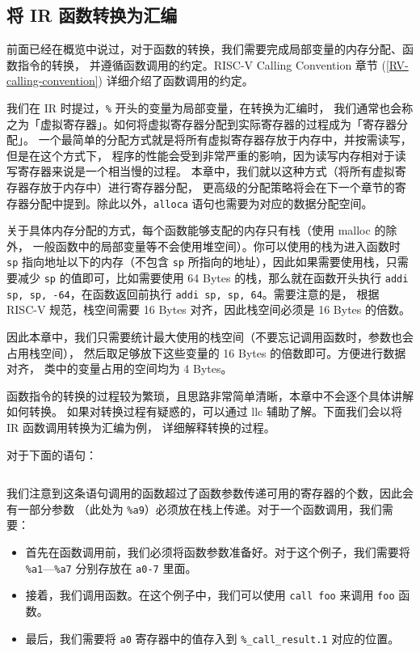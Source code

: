 \subsection{将 IR 函数转换为汇编}\label{IR-func-to-asm}

前面已经在概览中说过，对于函数的转换，我们需要完成局部变量的内存分配、函数指令的转换，
并遵循函数调用的约定。RISC-V Calling Convention 章节
(\ref{RV-calling-convention}) 详细介绍了函数调用的约定。

我们在 IR 时提过，\texttt{\%} 开头的变量为局部变量，在转换为汇编时，
我们通常也会称之为「虚拟寄存器」。如何将虚拟寄存器分配到实际寄存器的过程成为「寄存器分配」。
一个最简单的分配方式就是将所有虚拟寄存器存放于内存中，并按需读写，但是在这个方式下，
程序的性能会受到非常严重的影响，因为读写内存相对于读写寄存器来说是一个相当慢的过程。
本章中，我们就以这种方式（将所有虚拟寄存器存放于内存中）进行寄存器分配，
更高级的分配策略将会在下一个章节的寄存器分配中提到。除此以外，\texttt{alloca}
语句也需要为对应的数据分配空间。

关于具体内存分配的方式，每个函数能够支配的内存只有栈（使用 malloc 的除外，
一般函数中的局部变量等不会使用堆空间）。你可以使用的栈为进入函数时 \texttt{sp}
指向地址以下的内存（不包含 \texttt{sp} 所指向的地址），因此如果需要使用栈，只需要减少
\texttt{sp} 的值即可，比如需要使用 64 Bytes 的栈，那么就在函数开头执行
\texttt{addi sp, sp, -64}，在函数返回前执行 \texttt{addi sp, sp, 64}。需要注意的是，
根据 RISC-V 规范，栈空间需要 16 Bytes 对齐，因此栈空间必须是 16 Bytes 的倍数。

因此本章中，我们只需要统计最大使用的栈空间（不要忘记调用函数时，参数也会占用栈空间），
然后取足够放下这些变量的 16 Bytes 的倍数即可。方便进行数据对齐，
类中的变量占用的空间均为 4 Bytes。

函数指令的转换的过程较为繁琐，且思路非常简单清晰，本章中不会逐个具体讲解如何转换。
如果对转换过程有疑惑的，可以通过 llc 辅助了解。下面我们会以将 IR 函数调用转换为汇编为例，
详细解释转换的过程。

对于下面的语句：
\begin{lstlisting}[language=LLVM]
  %_call_result.1 = call i32 @foo(i32 %a1, i32 %a2, i32 %a3, i32 %a4, i32 %a5, i32 %a6, i32 %a7, i32 %a8, i32 %a9)
\end{lstlisting}

我们注意到这条语句调用的函数超过了函数参数传递可用的寄存器的个数，因此会有一部分参数
（此处为 \texttt{\%a9}）必须放在栈上传递。对于一个函数调用，我们需要：
\begin{itemize}
  \item 首先在函数调用前，我们必须将函数参数准备好。对于这个例子，我们需要将
    \texttt{\%a1}—\texttt{\%a7} 分别存放在 \texttt{a0-7} 里面。
  \item 接着，我们调用函数。在这个例子中，我们可以使用 \texttt{call foo} 来调用
    \texttt{foo} 函数。
  \item 最后，我们需要将 \texttt{a0} 寄存器中的值存入到 \texttt{\%\_call\_result.1}
    对应的位置。
\end{itemize}

